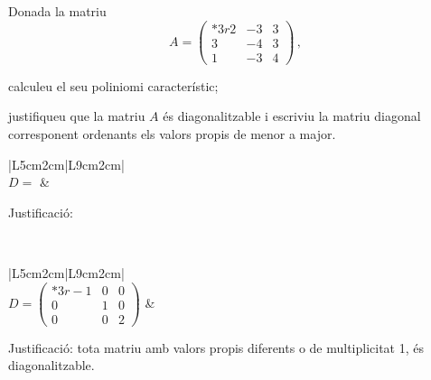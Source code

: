 \documentclass[10pt,catalan]{article}
\begin{document}
\begin{enunciat}
Donada la matriu
\[
   A=\begin{pmatrix}{*{3}r} 2 & -3 & 3\\ 3 & -4 & 3\\ 1 & -3 & 4\end{pmatrix}\,,
\]
\begin{apartats}
\item calculeu el seu poliniomi característic;
\item justifiqueu que la matriu $A$ és diagonalitzable i escriviu la matriu diagonal corresponent  ordenants els valors propis de menor a major.
\end{apartats}
\end{enunciat}

\begin{quadricula}
\begin{tabular}{|L{5cm}{2cm}|L{9cm}{2cm}|}
\hline
{} \\
\hline
$D=$ & \begin{minipage}[t]{8.8cm}Justificació:\vspace{1.8cm} \end{minipage}\\
\hline
\end{tabular}
\end{quadricula}

\begin{solucio}
\begin{center}
\begin{tabular}{|L{5cm}{2cm}|L{9cm}{2cm}|}
\hline
{} \\
\hline
$D=\begin{pmatrix}{*{3}r} -1 & 0 & 0\\ 0 & 1 & 0\\ 0 & 0 & 2\end{pmatrix}$ & 
\begin{minipage}[t]{8.8cm}
Justificació: tota matriu amb valors propis diferents o de multiplicitat 1, és diagonalitzable.
\vspace{1cm}
\end{minipage} \\
\hline
\end{tabular}
\end{center}
\end{solucio}
\end{document}
